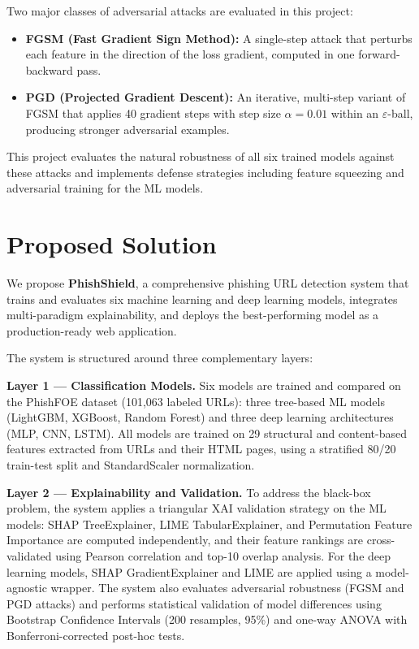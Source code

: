 Two major classes of adversarial attacks are evaluated in this project:
\begin{itemize}
    \item \textbf{FGSM (Fast Gradient Sign Method):} A single-step attack that perturbs each feature in the direction of the loss gradient, computed in one forward-backward pass.
    \item \textbf{PGD (Projected Gradient Descent):} An iterative, multi-step variant of FGSM that applies 40 gradient steps with step size $\alpha = 0.01$ within an $\varepsilon$-ball, producing stronger adversarial examples.
\end{itemize}

This project evaluates the natural robustness of all six trained models against these attacks and implements defense strategies including feature squeezing and adversarial training for the ML models.

\section{Proposed Solution}

We propose \textbf{PhishShield}, a comprehensive phishing URL detection system that trains and evaluates six machine learning and deep learning models, integrates multi-paradigm explainability, and deploys the best-performing model as a production-ready web application.

The system is structured around three complementary layers:

\textbf{Layer 1 — Classification Models.} Six models are trained and compared on the PhishFOE dataset (101,063 labeled URLs): three tree-based ML models (LightGBM, XGBoost, Random Forest) and three deep learning architectures (MLP, CNN, LSTM). All models are trained on 29 structural and content-based features extracted from URLs and their HTML pages, using a stratified 80/20 train-test split and StandardScaler normalization.

\textbf{Layer 2 — Explainability and Validation.} To address the black-box problem, the system applies a triangular XAI validation strategy on the ML models: SHAP TreeExplainer, LIME TabularExplainer, and Permutation Feature Importance are computed independently, and their feature rankings are cross-validated using Pearson correlation and top-10 overlap analysis. For the deep learning models, SHAP GradientExplainer and LIME are applied using a model-agnostic wrapper. The system also evaluates adversarial robustness (FGSM and PGD attacks) and performs statistical validation of model differences using Bootstrap Confidence Intervals (200 resamples, 95\%) and one-way ANOVA with Bonferroni-corrected post-hoc tests.

